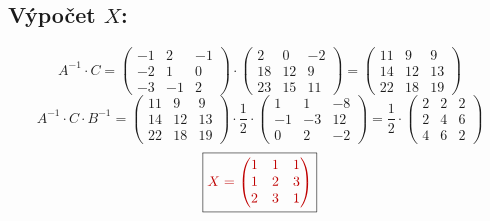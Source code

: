 \documentclass[10pt,a4paper]{article}
\newcommand{\vysl}[1]{\boxed{\color{red!75!black}#1}}
\begin{document}
\subsection*{Výpočet $X$:}
\[
A^{-1}\cdot C = \begin{pmatrix} -1 & 2 & -1\\ -2 & 1 & 0\\ -3 & -1 & 2 \end{pmatrix}\cdot
\begin{pmatrix} 2 & 0 & -2\\ 18 & 12 & 9\\ 23 & 15 & 11 \end{pmatrix}
= \begin{pmatrix} 11 & 9 & 9\\ 14 & 12 & 13\\ 22 & 18 & 19 \end{pmatrix}
\]
\[
A^{-1}\cdot C\cdot B^{-1} = \begin{pmatrix} 11 & 9 & 9\\ 14 & 12 & 13\\ 22 & 18 & 19 \end{pmatrix}\cdot\frac12\cdot
\begin{pmatrix} 1 & 1 & -8\\ -1 & -3 & 12\\ 0 & 2 & -2 \end{pmatrix}
= \frac12\cdot\begin{pmatrix} 2 & 2 & 2\\ 2 & 4 & 6\\ 4 & 6 & 2 \end{pmatrix}
\]
\[
\vysl{X=\begin{pmatrix} 1 & 1 & 1\\ 1 & 2 & 3\\ 2 & 3 & 1 \end{pmatrix}}
\]
\end{document}
